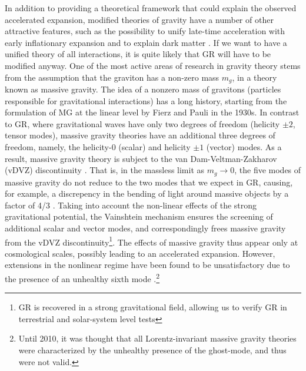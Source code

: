 \documentclass[prd,aps,psfig,nofootinbib,nobibnotes,superscriptaddress,preprintnumbers,times]{revtex4-2}\setlength{\topmargin}{-14mm}
\begin{document}
In addition to providing a theoretical framework that could explain the observed accelerated expansion, modified theories of gravity have a number of other attractive features, such as the possibility to unify late-time acceleration with early inflationary expansion \cite{Hinterbichler:2011tt,Clifton:2011jh,Nojiri:2010wj,Joyce:2014kja} 
and to explain dark matter \cite{Blas:2024jyh, Aoki:2016zgp}. 
If we want to have a unified theory of all interactions, it is quite likely that GR will have to be modified anyway.
One of the most active areas of research in gravity theory stems from the assumption that the graviton has a non-zero mass $m_g$, in a theory known as massive gravity. The idea of a nonzero mass of gravitons (particles responsible for gravitational interactions) has a long history, starting from the formulation of MG at the linear level by Fierz and Pauli \cite{Fierz:1939ix} in the 1930s. In contrast to GR, where gravitational waves have only two degrees of freedom (helicity $\pm 2$, tensor modes), massive gravity theories have an additional three degrees of freedom, namely, the helicity-$0$ (scalar) and helicity $\pm 1$ (vector) modes. As a result, massive gravity theory is subject to the van Dam-Veltman-Zakharov (vDVZ) discontinuity \cite{vanDam:1970vg,Zakharov:1970cc}. That is, in the massless limit as $m_g \rightarrow 0$, the five modes of massive gravity do not reduce to the two modes that we expect in GR, causing, for example, a discrepency in the bending of light around massive objects by a factor of 4/3 \cite{vanDam:1970vg}. Taking into account the non-linear effects of the strong gravitational potential, the Vainshtein mechanism \cite{Vainshtein:1972sx} ensures the screening of additional scalar and vector modes, and correspondingly frees massive gravity from the vDVZ discontinuity\footnote{GR is recovered in a strong gravitational field, allowing us to verify GR in terrestrial and solar-system level tests 
}. The effects of massive gravity thus appear only at
cosmological scales, possibly leading to an accelerated expansion.
However, extensions in the nonlinear regime have been found to be unsatisfactory due to the presence of an unhealthy sixth mode \cite{Boulware:1972yco}.\footnote{Until 2010, it was thought that all Lorentz-invariant massive gravity theories were characterized by the unhealthy presence of the ghost-mode, and thus were not valid. }
\end{document}
